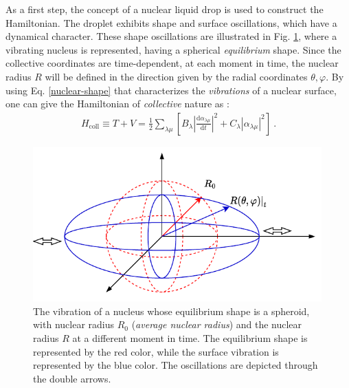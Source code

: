 As a first step, the concept of a nuclear liquid drop is used to construct the Hamiltonian. The droplet exhibits shape and surface oscillations, which have a dynamical character. These shape oscillations are illustrated in Fig. \ref{fig-nuclear-vibration}, where a vibrating nucleus is represented, having a spherical \emph{equilibrium} shape. Since the collective coordinates are time-dependent, at each moment in time, the nuclear radius $R$ will be defined in the direction given by the radial coordinates $\theta,\varphi$. By using Eq. \ref{nuclear-shape} that characterizes the \emph{vibrations} of a nuclear surface, one can give the Hamiltonian of \emph{collective} nature as \cite{ring2004nuclear,bertulani2007nuclear}:
\begin{align}
    H_\text{coll}\equiv T+V=\frac{1}{2}\sum_{\lambda\mu}\left[B_\lambda\left|\frac{\text{d}\alpha_{\lambda\mu}}{\text{d}t}\right|^2+C_\lambda|\alpha_{\lambda\mu}|^2\right]\ .
    \label{collective-hamiltonian-stiffness-inertia}
\end{align}
\begin{figure}
    \centering
    \includegraphics[width=0.99\textwidth]{Chapters/Figures/shape_oscillations.pdf}
    \caption{The vibration of a nucleus whose equilibrium shape is a spheroid, with nuclear radius $R_0$ (\emph{average nuclear radius}) and the nuclear radius $R$ at a different moment in time. The equilibrium shape is represented by the red color, while the surface vibration is represented by the blue color. The oscillations are depicted through the double arrows.}
    \label{fig-nuclear-vibration}
\end{figure}

